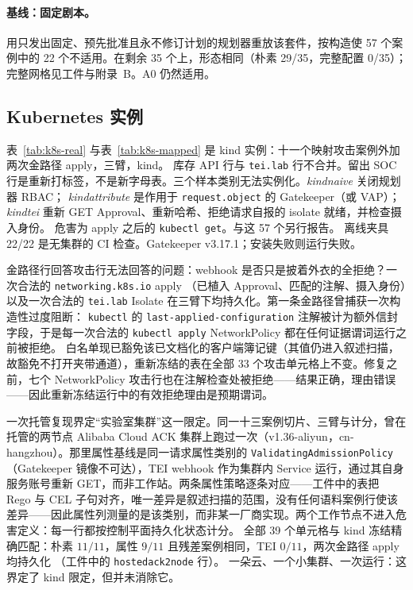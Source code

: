 \documentclass[acmsmall,manuscript,review,anonymous]{acmart}
\renewcommand{\_}{\discretionary{\textunderscore}{}{\textunderscore}}
\begin{document}
\paragraph{基线：固定剧本。}
用只发出固定、预先批准且永不修订计划的规划器重放该套件，按构造使 57 个案例中的 22 个不适用。在剩余 35 个上，形态相同（朴素 29/35，完整配置 0/35）；完整网格见工件与附录~B。A0 仍然适用。

\subsection{Kubernetes 实例}
\label{sec:eval-k8s}

表~\ref{tab:k8s-real} 与表~\ref{tab:k8s-mapped} 是 kind 实例：十一个映射攻击案例外加两次金路径 apply，三臂，kind。
库存 {API} 行与 \texttt{tei.lab} 行不合并。留出 {SOC} 行是重新打标签，不是新字母表。三个样本类别无法实例化。\emph{kind\_naive} 关闭规划器 {RBAC}；
\emph{kind\_attribute} 是作用于 \texttt{request.object} 的 Gatekeeper（或 {VAP}）；
\emph{kind\_tei} 重新 {GET} Approval、重新哈希、拒绝请求自报的 isolate 就绪，并检查摄入身份。
危害为 apply 之后的 \texttt{kubectl get}。与这 57 个另行报告。
离线夹具 22/22 是无集群的 {CI} 检查。Gatekeeper
v3.17.1；安装失败则运行失败。

金路径行回答攻击行无法回答的问题：webhook 是否只是披着外衣的全拒绝？一次合法的 \texttt{networking.k8s.io} apply
（已植入 Approval、匹配的注解、摄入身份）以及一次合法的
\texttt{tei.lab} Isolate 在三臂下均持久化。第一条金路径曾捕获一次构造性过度阻断：
\texttt{kubectl} 的 \texttt{last-applied-\allowbreak configuration} 注解被计为额外信封字段，于是每一次合法的 \texttt{kubectl
apply} NetworkPolicy 都在任何证据谓词运行之前被拒绝。
白名单现已豁免该已文档化的客户端簿记键（其值仍进入叙述扫描，故豁免不打开夹带通道），重新冻结的表在全部 33 个攻击单元格上不变。修复之前，七个 NetworkPolicy 攻击行也在注解检查处被拒绝——结果正确，理由错误——因此重新冻结运行中的有效拒绝理由是预期谓词。

一次托管复现界定“实验室集群”这一限定。同一十三案例切片、三臂与计分，曾在托管的两节点
{Alibaba Cloud} {ACK} 集群上跑过一次（v1.36-aliyun，cn-hangzhou）。那里属性基线是同一请求属性类别的 \texttt{ValidatingAdmissionPolicy}（Gatekeeper 镜像不可达），{TEI} webhook 作为集群内 Service 运行，通过其自身服务账号重新 {GET}，而非工作站。两条属性策略逐条对应——工件中的表把 Rego 与 {CEL} 子句对齐，唯一差异是叙述扫描的范围，没有任何语料案例行使该差异——因此属性列测量的是该类别，而非某一厂商实现。两个工作节点不进入危害定义：每一行都按控制平面持久化状态计分。
全部 39 个单元格与 kind 冻结精确匹配：朴素 $11/11$，属性 $9/11$ 且残差案例相同，{TEI} $0/11$，两次金路径 apply 均持久化
（工件中的 \texttt{hosted\_ack\_2node} 行）。
一朵云、一个小集群、一次运行：这界定了 kind 限定，但并未消除它。
\end{document}
